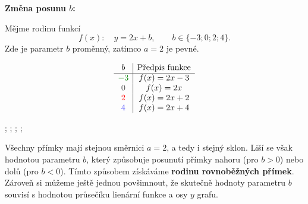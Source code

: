 \documentclass[12pt,a4paper]{article}
\begin{document}
\begin{examplebox}
\textbf{Změna posunu \(b\):}  

Mějme rodinu funkcí 
\[
f(x):\quad y = 2x + b, \qquad b \in \{-3; 0; 2; 4\}.
\]
Zde je parametr \(b\) proměnný, zatímco \(a = 2\) je pevné.

\[
\begin{array}{c|c}
b & \text{Předpis funkce} \\ \hline
\textcolor{green!50!black}{-3} & f(x) = 2x - 3 \\
\textcolor{black!70}{0} & f(x) = 2x \\
\textcolor{red}{2} & f(x) = 2x + 2 \\
\textcolor{blue}{4} & f(x) = 2x + 4
\end{array}
\]


\begin{center}
\begin{axisgraph}[
    grid=none,
    xmin=-3, xmax=3,
    ymin=-4, ymax=6,
    title={Různé hodnoty $b$ při $a=2$},
    axis lines=middle,
    width=9cm,
    height=6cm,
    domain=-3:3,
    samples=2
]
    ;
    ;
    ;
    ;
\end{axisgraph}
\end{center}

Všechny přímky mají stejnou směrnici \(a = 2\), a tedy i stejný sklon.  
Liší se však hodnotou parametru \(b\), který způsobuje posunutí přímky  
nahoru (pro \(b>0\)) nebo dolů (pro \(b<0\)).  
Tímto způsobem získáváme \textbf{rodinu rovnoběžných přímek}.
Zároveň si můžeme ještě jednou povšimnout, že skutečně hodnoty parametru $b$ 
souvisí s hodnotou průsečíku lienární funkce a osy $y$ grafu.
\end{examplebox}
\end{document}
